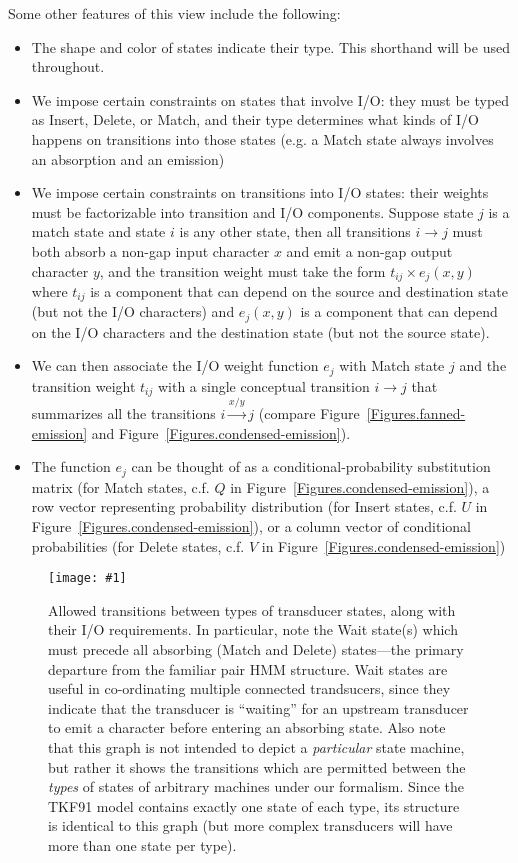 \documentclass{article}
\newcommand{\figref}[1]{Figure~\ref{Figures.#1}}
\newcommand{\figlabel}[1]{\label{Figures.#1}}
\newcommand{\easyfig}[4]{
\begin{figure}
\texttt{[image: \#1]}
\caption{ \figlabel{#3} #4}
\end{figure}}
\newcommand{\pngfig}[2]{\easyfig{#1.png}{}{#1}{#2}}
\begin{document}
Some other features of this view include the following:
\begin{itemize}
\item The shape and color of states indicate their type.  This shorthand will be used throughout.
\item We impose certain constraints on states that involve I/O:
 they must be typed  as Insert, Delete, or Match, and
 their type determines what kinds of I/O happens on transitions into those states (e.g. a Match state always involves an absorption and an emission)
\item We impose certain constraints on transitions into I/O states:
 their weights must be factorizable into transition and I/O components.
 Suppose state $j$ is a match state and state $i$ is any other state,
 then all transitions $i \to j$ must both absorb a non-gap input character $x$
 and emit a non-gap output character $y$,
 and the transition weight must take the form $t_{ij} \times e_j(x,y)$
 where $t_{ij}$ is a component that can depend on the source and destination state
  (but not the I/O characters)
 and $e_j(x,y)$ is a component that can depend on the I/O characters and the destination state
  (but not the source state).
\item We can then associate the I/O weight function $e_j$ with Match state $j$
 and the transition weight $t_{ij}$ with a single conceptual transition $i \to j$
 that summarizes all the transitions $i \stackrel{x/y}{\to} j$
 (compare \figref{fanned-emission} and \figref{condensed-emission}).
\item The function $e_j$ can be thought of as a conditional-probability substitution matrix
 (for Match states, c.f. $Q$ in \figref{condensed-emission}),
a row vector representing probability distribution
 (for Insert states, c.f. $U$ in \figref{condensed-emission}),
or a column vector of conditional probabilities
 (for Delete states, c.f. $V$ in \figref{condensed-emission})
\end{itemize}

\pngfig{transitions}
{Allowed transitions between types of transducer states, along with their I/O requirements.
In particular, note the Wait state(s) which must precede all 
absorbing (Match and Delete) states---the primary departure from the familiar pair HMM
structure.  
Wait states are useful in co-ordinating multiple connected trandsucers, since they indicate that
the transducer is ``waiting'' for an upstream transducer to emit a character before entering an
absorbing state. 
Also note that this graph is not intended to depict a {\em particular} state machine, 
but rather it shows the transitions which are permitted between the {\em types}
of states of arbitrary machines under our formalism.  
Since the TKF91 model contains exactly one state of each type,
 its structure is identical to this graph 
(but more complex transducers will have more than one state per type).  }
\end{document}
